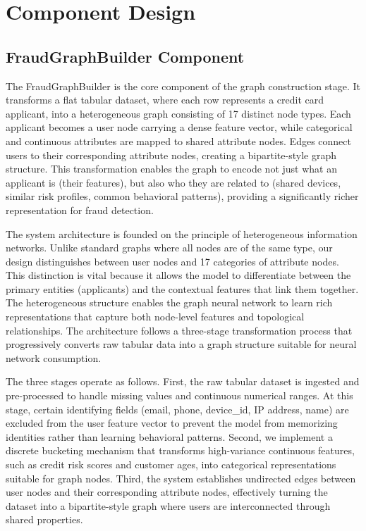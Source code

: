 \section{Component Design}

\subsection{FraudGraphBuilder Component}

The FraudGraphBuilder is the core component of the graph construction stage. It transforms a flat tabular dataset, where each row represents a credit card applicant, into a heterogeneous graph consisting of 17 distinct node types. Each applicant becomes a user node carrying a dense feature vector, while categorical and continuous attributes are mapped to shared attribute nodes. Edges connect users to their corresponding attribute nodes, creating a bipartite-style graph structure. This transformation enables the graph to encode not just what an applicant is (their features), but also who they are related to (shared devices, similar risk profiles, common behavioral patterns), providing a significantly richer representation for fraud detection.

The system architecture is founded on the principle of heterogeneous information networks. Unlike standard graphs where all nodes are of the same type, our design distinguishes between user nodes and 17 categories of attribute nodes. This distinction is vital because it allows the model to differentiate between the primary entities (applicants) and the contextual features that link them together. The heterogeneous structure enables the graph neural network to learn rich representations that capture both node-level features and topological relationships. The architecture follows a three-stage transformation process that progressively converts raw tabular data into a graph structure suitable for neural network consumption.

The three stages operate as follows. First, the raw tabular dataset is ingested and pre-processed to handle missing values and continuous numerical ranges. At this stage, certain identifying fields (email, phone, device\_id, IP address, name) are excluded from the user feature vector to prevent the model from memorizing identities rather than learning behavioral patterns. Second, we implement a discrete bucketing mechanism that transforms high-variance continuous features, such as credit risk scores and customer ages, into categorical representations suitable for graph nodes. Third, the system establishes undirected edges between user nodes and their corresponding attribute nodes, effectively turning the dataset into a bipartite-style graph where users are interconnected through shared properties.

